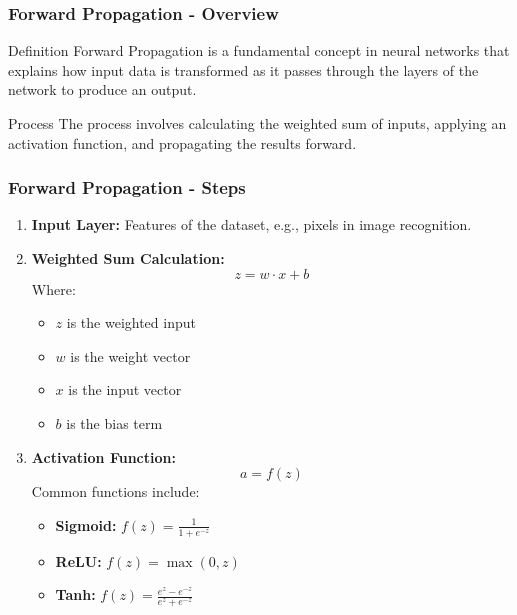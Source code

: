 \documentclass[aspectratio=169]{beamer}
\begin{document}
\begin{frame}[fragile]
    \frametitle{Forward Propagation - Overview}
    \begin{block}{Definition}
        Forward Propagation is a fundamental concept in neural networks that explains how input data is transformed as it passes through the layers of the network to produce an output.
    \end{block}
    
    \begin{block}{Process}
        The process involves calculating the weighted sum of inputs, applying an activation function, and propagating the results forward.
    \end{block}
\end{frame}

\begin{frame}[fragile]
    \frametitle{Forward Propagation - Steps}
    \begin{enumerate}
        \item \textbf{Input Layer:} Features of the dataset, e.g., pixels in image recognition.
        \item \textbf{Weighted Sum Calculation:}
            \[
            z = w \cdot x + b
            \]
            Where:
            \begin{itemize}
                \item \( z \) is the weighted input
                \item \( w \) is the weight vector
                \item \( x \) is the input vector
                \item \( b \) is the bias term
            \end{itemize}
        \item \textbf{Activation Function:}
            \[
            a = f(z)
            \]
            Common functions include:
            \begin{itemize}
                \item \textbf{Sigmoid:} \( f(z) = \frac{1}{1 + e^{-z}} \)
                \item \textbf{ReLU:} \( f(z) = \max(0, z) \)
                \item \textbf{Tanh:} \( f(z) = \frac{e^{z} - e^{-z}}{e^{z} + e^{-z}} \)
            \end{itemize}
    \end{enumerate}
\end{frame}
\end{document}
